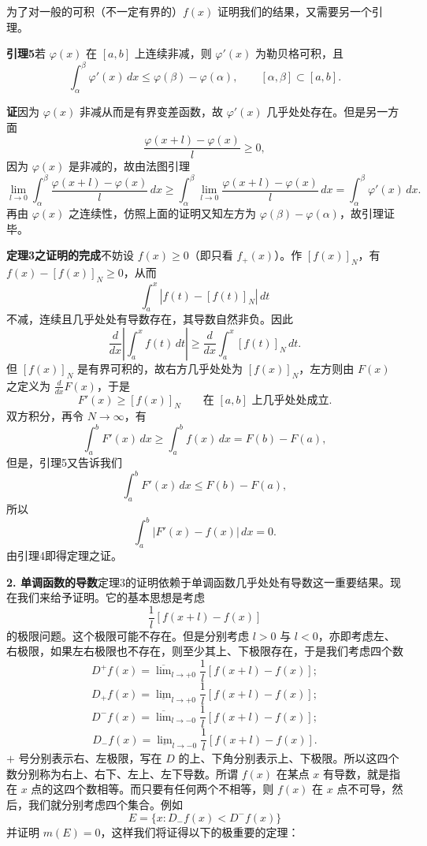 为了对一般的可积（不一定有界的）$f(x)$ 证明我们的结果，又需要另一个引理。

\noindent\textbf{引理5}\quad 若 $\varphi(x)$ 在 $[a,b]$ 上连续非减，则 $\varphi'(x)$ 为勒贝格可积，且
\begin{equation}
 \int_\alpha^\beta\varphi'(x)\,dx\le\varphi(\beta)-\varphi(\alpha),
 \qquad [\alpha,\beta]\subset[a,b].
 \tag{10}
\end{equation}

\noindent\textbf{证}\quad 因为 $\varphi(x)$ 非减从而是有界变差函数，故 $\varphi'(x)$ 几乎处处存在。但是另一方面
\[
 \frac{\varphi(x+l)-\varphi(x)}{l}\ge0,
\]
因为 $\varphi(x)$ 是非减的，故由法图引理
\[
 \lim_{l\to0}\int_\alpha^\beta\frac{\varphi(x+l)-\varphi(x)}{l}\,dx
 \ge\int_\alpha^\beta\lim_{l\to0}\frac{\varphi(x+l)-\varphi(x)}{l}\,dx
 =\int_\alpha^\beta\varphi'(x)\,dx.
\]
再由 $\varphi(x)$ 之连续性，仿照上面的证明又知左方为 $\varphi(\beta)-\varphi(\alpha)$，故引理证毕。

\noindent\textbf{定理3之证明的完成}\quad 不妨设 $f(x)\ge0$（即只看 $f_+(x)$）。作 $[f(x)]_N$，有 $f(x)-[f(x)]_N\ge0$，从而
\[
 \int_a^x|f(t)-[f(t)]_N|\,dt
\]
不减，连续且几乎处处有导数存在，其导数自然非负。因此
\begin{equation}
 \frac{d}{dx}\left|\int_a^x f(t)\,dt\right|
 \ge \frac{d}{dx}\int_a^x[f(t)]_N\,dt.
 \tag{11}
\end{equation}
但 $[f(x)]_N$ 是有界可积的，故右方几乎处处为 $[f(x)]_N$，左方则由 $F(x)$ 之定义为 $\frac{d}{dx}F(x)$，于是
\[
 F'(x)\ge[f(x)]_N
 \qquad\text{在 }[a,b]\text{ 上几乎处处成立}.
\]
双方积分，再令 $N\to\infty$，有
\[
 \int_a^bF'(x)\,dx\ge\int_a^bf(x)\,dx=F(b)-F(a),
\]
但是，引理5又告诉我们
\[
 \int_a^bF'(x)\,dx\le F(b)-F(a),
\]
所以
\[
 \int_a^b|F'(x)-f(x)|\,dx=0.
\]
由引理4即得定理之证。

\medskip
\noindent\textbf{2. 单调函数的导数}\quad 定理3的证明依赖于单调函数几乎处处有导数这一重要结果。现在我们来给予证明。它的基本思想是考虑
\[
 \frac1l[f(x+l)-f(x)]
\]
的极限问题。这个极限可能不存在。但是分别考虑 $l>0$ 与 $l<0$，亦即考虑左、右极限，如果左右极限也不存在，则至少其上、下极限存在，于是我们考虑四个数
\[
 D^+f(x)=\overline{\lim}_{l\to+0}\frac1l[f(x+l)-f(x)];
\]
\[
 D_+f(x)=\underline{\lim}_{l\to+0}\frac1l[f(x+l)-f(x)];
\]
\[
 D^-f(x)=\overline{\lim}_{l\to-0}\frac1l[f(x+l)-f(x)];
\]
\[
 D_-f(x)=\underline{\lim}_{l\to-0}\frac1l[f(x+l)-f(x)].
\]
$+$ 号分别表示右、左极限，写在 $D$ 的上、下角分别表示上、下极限。所以这四个数分别称为右上、右下、左上、左下导数。所谓 $f(x)$ 在某点 $x$ 有导数，就是指在 $x$ 点的这四个数相等。而只要有任何两个不相等，则 $f(x)$ 在 $x$ 点不可导，然后，我们就分别考虑四个集合。例如
\[
 E=\{x:D_-f(x)<D^-f(x)\}
\]
并证明 $m(E)=0$，这样我们将证得以下的极重要的定理：

